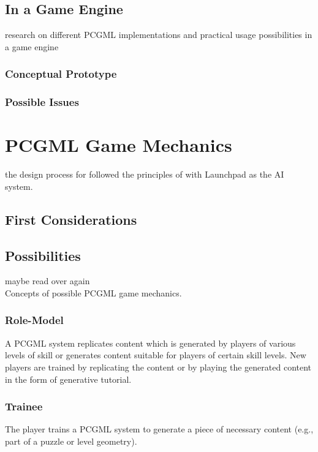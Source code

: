 \documentclass[MGS,Master,english]{twbook}%
\begin{document}
\section{In a Game Engine}
research on different PCGML implementations and practical usage possibilities in a game engine
\subsection{Conceptual Prototype}
\subsection{Possible Issues}
%
%
\clearpage
\chapter{\acl{PCGML} Game Mechanics}
the design process for \cite{pcg::endlessWeb} followed the principles of \cite{ai::gameDesign} with Launchpad as the AI system.

\section{First Considerations}

\section{Possibilities}
maybe read over \cite{pcg::endlessWeb} again\\
Concepts of possible PCGML game mechanics.

\subsection{Role-Model}
A \ac{PCGML} system replicates content which is generated by players of various levels of skill or generates content suitable for players of certain skill levels. New players are trained by replicating the content or by playing the generated content in the form of generative tutorial. \cite{pcgml::paper}

\subsection{Trainee}
The player trains a \ac{PCGML} system to generate a piece of necessary content (e.g., part of a puzzle or level geometry). \cite{pcgml::paper}
\end{document}
